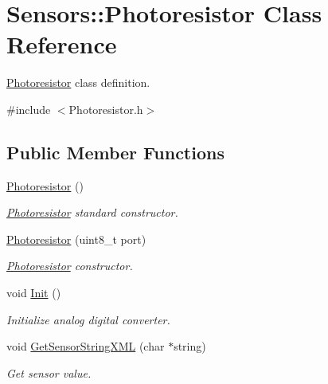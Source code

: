 \hypertarget{classSensors_1_1Photoresistor}{}\section{Sensors\+:\+:Photoresistor Class Reference}
\label{classSensors_1_1Photoresistor}


\hyperlink{classSensors_1_1Photoresistor}{Photoresistor} class definition.  




{\ttfamily \#include $<$Photoresistor.\+h$>$}

\subsection*{Public Member Functions}
\begin{DoxyCompactItemize}
\item 
\hyperlink{classSensors_1_1Photoresistor_a636b09df1c219714314a691bef87a6bd}{Photoresistor} ()
\begin{DoxyCompactList}\small\item\em \hyperlink{classSensors_1_1Photoresistor}{Photoresistor} standard constructor. \end{DoxyCompactList}\item 
\hyperlink{classSensors_1_1Photoresistor_a53ca472fb36f5ce8b9e199ddcc1ea188}{Photoresistor} (uint8\+\_\+t port)
\begin{DoxyCompactList}\small\item\em \hyperlink{classSensors_1_1Photoresistor}{Photoresistor} constructor. \end{DoxyCompactList}\item 
void \hyperlink{classSensors_1_1Photoresistor_a62a0993f8a84a827b843d9bcdded089e}{Init} ()
\begin{DoxyCompactList}\small\item\em Initialize analog digital converter. \end{DoxyCompactList}\item 
void \hyperlink{classSensors_1_1Photoresistor_a06b802026054f93a7b6659db0ffe731e}{Get\+Sensor\+String\+X\+ML} (char $\ast$string)
\begin{DoxyCompactList}\small\item\em Get sensor value. \end{DoxyCompactList}\end{DoxyCompactItemize}
